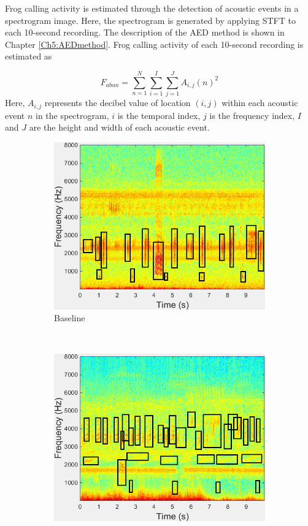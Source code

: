 Frog calling activity is estimated through the detection of acoustic events in a spectrogram image. Here, the spectrogram is generated by applying STFT to each 10-second recording. The description of the AED method is shown in Chapter \ref{Ch5:AEDmethod}. Frog calling activity of each 10-second recording is estimated as 

\begin{equation}
F_{abun} = \sum_{n=1}^{N}\sum_{i=1}^{I}\sum_{j=1}^{J} A_{i,j}(n)^2
\end{equation}
Here, $A_{i,j}$ represents the decibel value of location $(i,j)$ within each acoustic event $n$ in the spectrogram, $i$ is the temporal index, $j$ is the frequency index, $I$ and $J$ are the height and width of each acoustic event.

\begin{figure}
        \centering       
        \begin{subfigure}[b]{0.35\textwidth}
                \includegraphics[width=\textwidth]{image/Ch7/spectrogram1-m.png}
                \caption{Baseline}
        \end{subfigure}%
 ~       
        \begin{subfigure}[b]{0.35\textwidth}
                \includegraphics[width=\textwidth]{image/Ch7/spectrogram2-m.png}

\end{subfigure}
\end{figure}
